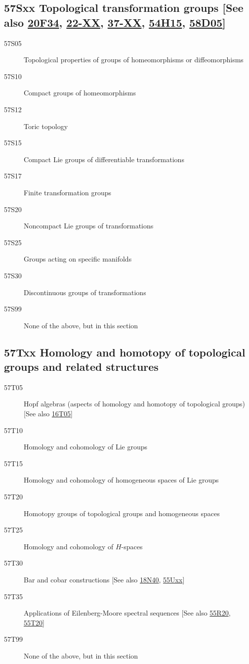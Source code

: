 \subsection*{57Sxx  Topological transformation groups [See also \hyperref[20F34]{20F34}, \hyperref[22-XX]{22-XX}, \hyperref[37-XX]{37-XX}, \hyperref[54H15]{54H15}, \hyperref[58D05]{58D05}] }\label{57Sxx}
\begin{description}  
\item [57S05]\label{57S05} Topological properties of groups of homeomorphisms or diffeomorphisms
\item [57S10]\label{57S10} Compact groups of homeomorphisms
\item [57S12]\label{57S12} Toric topology
\item [57S15]\label{57S15} Compact Lie groups of differentiable transformations
\item [57S17]\label{57S17} Finite transformation groups
\item [57S20]\label{57S20} Noncompact Lie groups of transformations
\item [57S25]\label{57S25} Groups acting on specific manifolds
\item [57S30]\label{57S30} Discontinuous groups of transformations
\item [57S99]\label{57S99} None of the above, but in this section
\end{description}
\subsection*{57Txx  Homology and homotopy of topological groups and related structures }\label{57Txx}
\begin{description}  
\item [57T05]\label{57T05} Hopf algebras (aspects of homology and homotopy of topological groups) [See also \hyperref[16T05]{16T05}]
\item [57T10]\label{57T10} Homology and cohomology of Lie groups
\item [57T15]\label{57T15} Homology and cohomology of homogeneous spaces of Lie groups
\item [57T20]\label{57T20} Homotopy groups of topological groups and homogeneous spaces
\item [57T25]\label{57T25} Homology and cohomology of $H$-spaces
\item [57T30]\label{57T30} Bar and cobar constructions [See also \hyperref[18N40]{18N40}, \hyperref[55Uxx]{55Uxx}]
\item [57T35]\label{57T35} Applications of Eilenberg-Moore spectral sequences [See also \hyperref[55R20]{55R20}, \hyperref[55T20]{55T20}]
\item [57T99]\label{57T99} None of the above, but in this section
\end{description}
